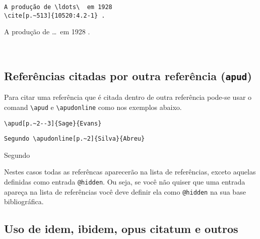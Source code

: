 \documentclass[espacosimples]{abnt}
\newcommand{\VerbL}{0.54\textwidth}
\newcommand{\LatL}{0.45\textwidth}
\begin{document}
\noindent\begin{minipage}[t]{\VerbL}\small\begin{verbatim}
A produção de \ldots\  em 1928
\cite[p.~513]{10520:4.2-1} .
\end{verbatim}\end{minipage}\begin{minipage}[t]{\LatL}\small
A produção de \ldots\  em 1928 \cite[p.~513]{10520:4.2-1} .
\end{minipage}\vspace{5mm}\\


\subsection{Referências citadas por outra referência ({\tt apud})}

Para citar uma referência que é citada dentro de outra referência pode-se
usar o comand \verb+\apud+ e \verb+\apudonline+ como nos exemplos abaixo.

\noindent\begin{minipage}[t]{\VerbL}\small\begin{verbatim}
\apud[p.~2--3]{Sage}{Evans}
\end{verbatim}\end{minipage}\begin{minipage}[t]{\LatL}\small
{}
\end{minipage}

\noindent\begin{minipage}[t]{\VerbL}\small\begin{verbatim}
Segundo \apudonline[p.~2]{Silva}{Abreu}
\end{verbatim}\end{minipage}\begin{minipage}[t]{\LatL}\small
Segundo 
\end{minipage}

Nestes casos todas as referêncas aparecerão na lista de referências, exceto
aquelas definidas como entrada {\tt @hidden}. Ou seja, se você não quiser
que uma entrada apareça na lista de referências você deve definir ela como
{\tt @hidden} na sua base bibliográfica.

\subsection{Uso de idem, ibidem, opus citatum e outros}
\end{document}
